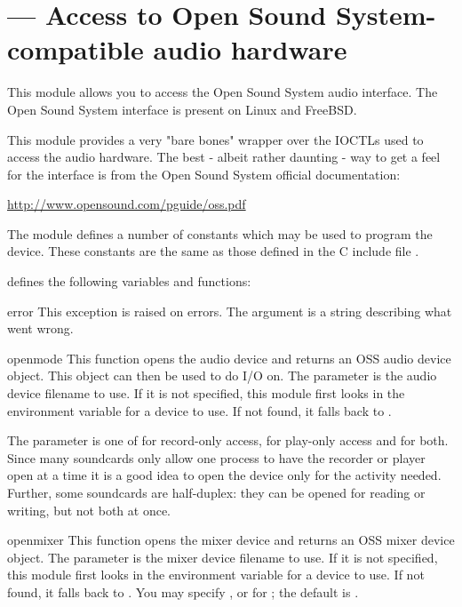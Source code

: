 \section{ ---
         Access to Open Sound System-compatible audio hardware}


This module allows you to access the Open Sound System audio interface.
The Open Sound System interface is present on Linux and FreeBSD.

This module provides a very "bare bones" wrapper over the IOCTLs used to
access the audio hardware. The best - albeit rather daunting - way to
get a feel for the interface is from the Open Sound System official
documentation:

\url{http://www.opensound.com/pguide/oss.pdf}

The module defines a number of constants which may be used to program the
device. These constants are the same as those defined in the C include file
.

 defines the following variables and functions:

\begin{excdesc}{error}
This exception is raised on errors. The argument is a string
describing what went wrong.
\end{excdesc}

\begin{funcdesc}{open}{mode}
This function opens the audio device and returns an OSS audio device
object. This object can then be used to do I/O on. The 
parameter is the audio device filename to use. If it is not specified, this
module first looks in the environment variable  for a device
to use. If not found, it falls back to .

The  parameter is one of  for record-only access,
 for play-only access and  for both. Since many
soundcards only allow one process to have the recorder or player open at
a time it is a good idea to open the device only for the activity
needed. Further, some soundcards are half-duplex: they can be opened for reading
or writing, but not both at once.
\end{funcdesc}

\begin{funcdesc}{openmixer}{} This function
opens the mixer device and returns an OSS mixer device object. The 
parameter is the mixer device filename to use. If it is not specified, this
module first looks in the environment variable  for a device to
use. If not found, it falls back to . You may specify
,  or  for ; the default is .

\end{funcdesc}

